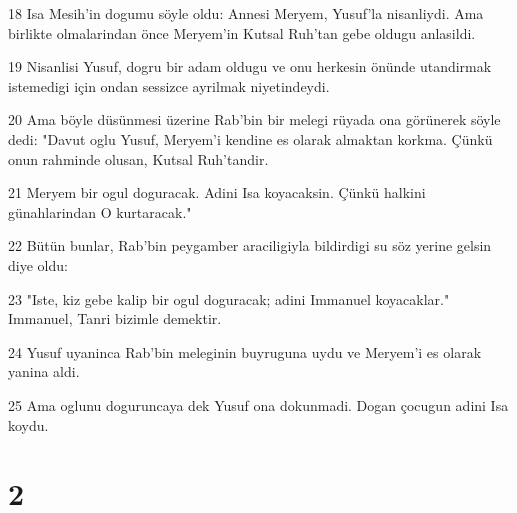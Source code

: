 \par 18 Isa Mesih'in dogumu söyle oldu: Annesi Meryem, Yusuf'la nisanliydi. Ama birlikte olmalarindan önce Meryem'in Kutsal Ruh'tan gebe oldugu anlasildi.
\par 19 Nisanlisi Yusuf, dogru bir adam oldugu ve onu herkesin önünde utandirmak istemedigi için ondan sessizce ayrilmak niyetindeydi.
\par 20 Ama böyle düsünmesi üzerine Rab'bin bir melegi rüyada ona görünerek söyle dedi: "Davut oglu Yusuf, Meryem'i kendine es olarak almaktan korkma. Çünkü onun rahminde olusan, Kutsal Ruh'tandir.
\par 21 Meryem bir ogul doguracak. Adini Isa koyacaksin. Çünkü halkini günahlarindan O kurtaracak."
\par 22 Bütün bunlar, Rab'bin peygamber araciligiyla bildirdigi su söz yerine gelsin diye oldu:
\par 23 "Iste, kiz gebe kalip bir ogul doguracak; adini Immanuel koyacaklar." Immanuel, Tanri bizimle demektir.
\par 24 Yusuf uyaninca Rab'bin meleginin buyruguna uydu ve Meryem'i es olarak yanina aldi.
\par 25 Ama oglunu doguruncaya dek Yusuf ona dokunmadi. Dogan çocugun adini Isa koydu.

\chapter{2}

